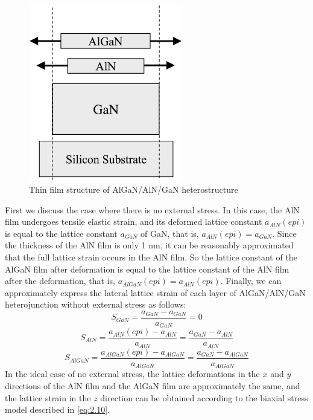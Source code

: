 \begin{figure}[H] 
\centering    
\includegraphics[width=0.6\textwidth]{ch2_8}
\caption[Thin film structure of AlGaN/AlN/GaN heterostructure]{Thin film structure of AlGaN/AlN/GaN heterostructure}
\label{fig:2.8}
\end{figure}

First we discuss the case where there is no external stress. In this case, the AlN film undergoes tensile  elastic strain, and its deformed lattice constant $a_{AlN}(epi)$ is equal to the lattice constant  $a_{GaN}$ of GaN, that is, $a_{AlN}(epi)=a_{GaN}$. Since the thickness of the AlN film is only 1 \unit{nm}, it can be reasonably approximated that the full lattice strain occurs in the AlN film. So the  lattice constant of the AlGaN film after deformation  is equal to the lattice constant of the AlN film after the deformation, that is, $a_{AlGaN}(epi)=a_{AlN}(epi)$. Finally, we can approximately express the lateral lattice strain  of each layer of AlGaN/AlN/GaN  heterojunction without external stress as follows:
\begin{equation}
S_{G a N}=\frac{a_{G a N}-a_{G a N}}{a_{G a N}}=0
\label{eq:2.13}
\end{equation}
\begin{equation}
S_{A l N}=\frac{a_{A l N}(e p i)-a_{A l N}}{a_{A l N}}=\frac{a_{G a N}-a_{A l N}}{a_{A l N}}
\label{eq:2.14}
\end{equation}
\begin{equation}
S_{AlGaN }=\frac{a_{A l G a N}(e p i)-a_{A l G a N}}{a_{A l G a N}}=\frac{a_{G a N}-a_{A l G a N}}{a_{A l G a N}}
\label{eq:2.15}
\end{equation}
In the ideal case of no external stress, the lattice deformations  in the $x$ and $y$ directions of the AlN film and the AlGaN film are approximately the same, and the  lattice strain in the $z$ direction can be obtained according to the biaxial stress model  described in \autoref{eq:2.10}.

